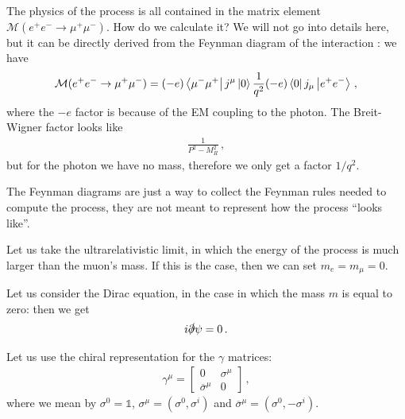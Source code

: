 \documentclass[main.tex]{subfiles}
\begin{document}
The physics of the process is all contained in the matrix element \(\mathcal{M}(e^{+}e^{-} \to \mu^+ \mu^-)\). How do we calculate it? We will not go into details here, but it can be directly derived from the Feynman diagram of the interaction \cite[sec.\ 4.1.2]{tissinoTheoreticalPhysicsNotes2020}: we have 
%
\begin{align}
\mathcal{M}(e^{+}e^{-} \to \mu^+ \mu^-) = 
(-e)
\bra{\mu^- \mu^+} j^{\mu } \ket{0}
\frac{1}{q^2}
(-e)
\bra{0} j_{\mu } \ket{e^{+} e^{-}}
\,,
\end{align}
%
where the \(-e\) factor is because of the EM coupling to the photon. 
The Breit-Wigner factor looks like 
%
\begin{align}
\frac{1}{P^2-M_R^2}
\,,
\end{align}
%
but for the photon we have no mass, therefore we only get a factor \(1/q^2\). 

The Feynman diagrams are just a way to collect the Feynman rules needed to compute the process, they are not meant to represent how the process ``looks like''. 

Let us take the ultrarelativistic limit, in which the energy of the process is much larger than the muon's mass. 
If this is the case, then we can set \(m_e = m_\mu  = 0\). 

Let us consider the Dirac equation, in the case in which the mass \(m\) is equal to zero: then we get 
%
\begin{align}
i \slashed{\partial} \psi = 0
\,.
\end{align}

Let us use the chiral representation for the \(\gamma \) matrices: 
%
\begin{subequations}
\begin{align}
\gamma^{\mu } = \left[\begin{array}{cc}
0 & \sigma^{\mu } \\ 
\overline{\sigma}^{\mu } & 0
\end{array}\right] 
\,,
\end{align}
\end{subequations}
%
where we mean by \(\sigma^{0} = \mathbb{1}\), \(\sigma^{\mu } = (\sigma^{0}, \sigma^{i})\) and \(\overline{\sigma}^{\mu } = (\sigma^{0}, - \sigma^{i})\).
\end{document}
